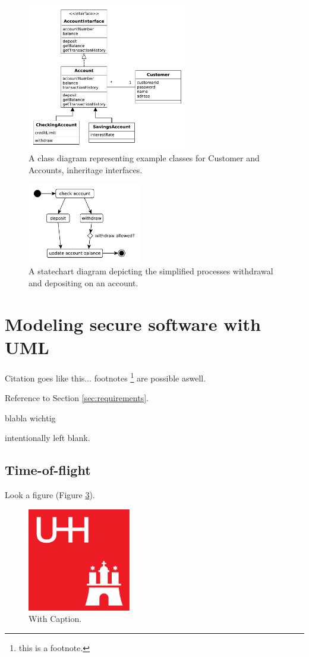 \documentclass{acmtog} %
\begin{document}
\begin{figure}[ht]
\centerline{\includegraphics[width=7cm]{img/uml-banking/class-diagram}}
\caption{A class diagram representing example classes for Customer and Accounts, inheritage interfaces.}
    \label{fig:class-diagram}
\end{figure}

\begin{figure}[ht]
\centerline{\includegraphics[width=5cm]{img/uml-banking/statechart-diagram}}
\caption{A statechart diagram depicting the simplified processes withdrawal and depositing on an account.}
    \label{fig:statechart-diagram}
\end{figure}

\section{Modeling secure software with UML}
\label{sec:umlsec}


Citation goes like this... \cite{SHRB11}
footnotes \footnote{this is a footnote.} are possible aswell.

Reference to Section \ref{sec:requirements}.

blabla wichtig

intentionally left blank.

\subsection{Time-of-flight}

Look a figure (Figure \ref{fig:figure}).
\begin{figure}[ht]
\centerline{\includegraphics[width=4.5cm]{img/uhh}}
\caption{With Caption.}
    \label{fig:figure}
\end{figure}
\end{document}
